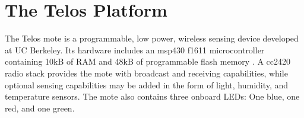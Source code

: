 
\section{The Telos Platform}

The Telos mote \cite{polastre:2005} is a programmable, low power, wireless sensing device developed at UC Berkeley. Its hardware includes an msp430 f1611 microcontroller containing 10kB of RAM and 48kB of programmable flash memory \cite{msp:2011}. A cc2420 radio stack provides the mote with broadcast and receiving capabilities, while optional sensing capabilities may be added in the form of light, humidity, and temperature sensors. The mote also contains three onboard LEDs: One blue, one red, and one green.

